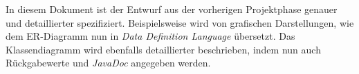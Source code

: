 
In diesem Dokument ist der Entwurf aus der vorherigen Projektphase genauer und detaillierter spezifiziert. Beispielsweise wird von grafischen Darstellungen, wie dem ER-Diagramm nun in \emph{Data Definition Language} übersetzt. Das Klassendiagramm wird ebenfalls detaillierter beschrieben, indem nun auch Rückgabewerte und \emph{JavaDoc} angegeben werden.
